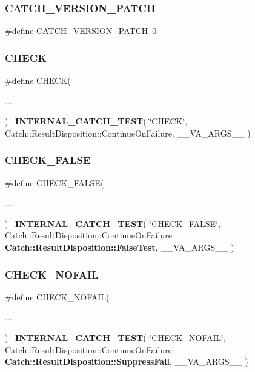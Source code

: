 \subsubsection{CATCH\_VERSION\_PATCH}
{\footnotesize\ttfamily \#define C\+A\+T\+C\+H\+\_\+\+V\+E\+R\+S\+I\+O\+N\+\_\+\+P\+A\+T\+CH~0}

\mbox{\label{catch_8hpp_a836cca6b6ed3a1706353f6d1bca0935f}} 
\subsubsection{CHECK}
{\footnotesize\ttfamily \#define C\+H\+E\+CK(\begin{DoxyParamCaption}\item[{}]{... }\end{DoxyParamCaption})~\textbf{ I\+N\+T\+E\+R\+N\+A\+L\+\_\+\+C\+A\+T\+C\+H\+\_\+\+T\+E\+ST}( \char`\"{}C\+H\+E\+CK\char`\"{}, Catch\+::\+Result\+Disposition\+::\+Continue\+On\+Failure, \+\_\+\+\_\+\+V\+A\+\_\+\+A\+R\+G\+S\+\_\+\+\_\+ )}

\mbox{\label{catch_8hpp_a7bf095d8512cb180f8ff3a2258a6eaac}} 
\subsubsection{CHECK\_FALSE}
{\footnotesize\ttfamily \#define C\+H\+E\+C\+K\+\_\+\+F\+A\+L\+SE(\begin{DoxyParamCaption}\item[{}]{... }\end{DoxyParamCaption})~\textbf{ I\+N\+T\+E\+R\+N\+A\+L\+\_\+\+C\+A\+T\+C\+H\+\_\+\+T\+E\+ST}( \char`\"{}C\+H\+E\+C\+K\+\_\+\+F\+A\+L\+SE\char`\"{}, Catch\+::\+Result\+Disposition\+::\+Continue\+On\+Failure $\vert$ \textbf{ Catch\+::\+Result\+Disposition\+::\+False\+Test}, \+\_\+\+\_\+\+V\+A\+\_\+\+A\+R\+G\+S\+\_\+\+\_\+ )}

\mbox{\label{catch_8hpp_a13c6feaf82c3c419104c50dbb8caa3ef}} 
\subsubsection{CHECK\_NOFAIL}
{\footnotesize\ttfamily \#define C\+H\+E\+C\+K\+\_\+\+N\+O\+F\+A\+IL(\begin{DoxyParamCaption}\item[{}]{... }\end{DoxyParamCaption})~\textbf{ I\+N\+T\+E\+R\+N\+A\+L\+\_\+\+C\+A\+T\+C\+H\+\_\+\+T\+E\+ST}( \char`\"{}C\+H\+E\+C\+K\+\_\+\+N\+O\+F\+A\+IL\char`\"{}, Catch\+::\+Result\+Disposition\+::\+Continue\+On\+Failure $\vert$ \textbf{ Catch\+::\+Result\+Disposition\+::\+Suppress\+Fail}, \+\_\+\+\_\+\+V\+A\+\_\+\+A\+R\+G\+S\+\_\+\+\_\+ )}

